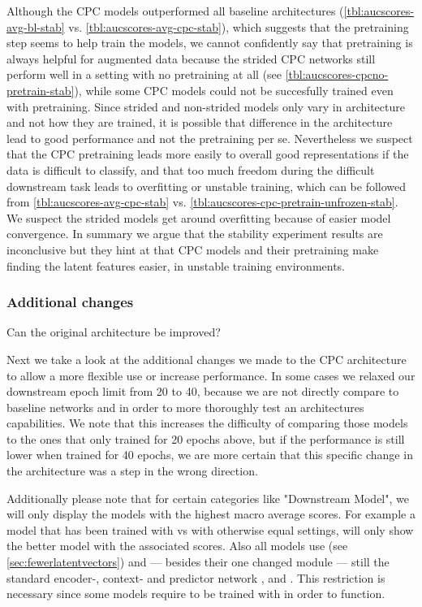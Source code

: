 Although the CPC models outperformed all baseline architectures (\autoref{tbl:aucscores-avg-bl-stab} vs. \autoref{tbl:aucscores-avg-cpc-stab}), which suggests that the pretraining step seems to help train the models, we cannot confidently say that pretraining is always helpful for augmented data because the strided CPC networks still perform well in a setting with no pretraining at all (see \autoref{tbl:aucscores-cpcno-pretrain-stab}), while some CPC models could not be succesfully trained even with pretraining. Since strided and non-strided models only vary in architecture and not how they are trained, it is possible that difference in the architecture lead to good performance and not the pretraining per se. Nevertheless we suspect that the CPC pretraining leads more easily to overall good representations if the data is difficult to classify, and that too much freedom during the difficult downstream task leads to overfitting or unstable training, which can be followed from \autoref{tbl:aucscores-avg-cpc-stab} vs. \autoref{tbl:aucscores-cpc-pretrain-unfrozen-stab}. We suspect the strided models get around overfitting because of easier model convergence. In summary we argue that the stability experiment results are inconclusive but they hint at that CPC models and their pretraining make finding the latent features easier, in unstable training environments.


\subsubsection{Additional changes}\label{sec:additionalchanges}
Can the original architecture be improved?

Next we take a look at the additional changes we made to the CPC architecture to allow a more flexible use or increase performance. In some cases we relaxed our downstream epoch limit from 20 to 40, because we are not directly compare to baseline networks and in order to more thoroughly test an architectures capabilities. We note that this increases the difficulty of comparing those models to the ones that only trained for 20 epochs above, but if the performance is still lower when trained for 40 epochs, we are more certain that this specific change in the architecture was a step in the wrong direction.

Additionally please note that for certain categories like "Downstream Model", we will only display the models with the highest macro average scores. For example a model that has been trained with  vs  with otherwise equal settings, will only show the better model with the associated scores. Also all models use  (see \autoref{sec:fewerlatentvectors}) and --- besides their one changed module --- still the standard encoder-, context- and predictor network ,  and . This restriction is necessary since some models require to be trained with  in order to function.

